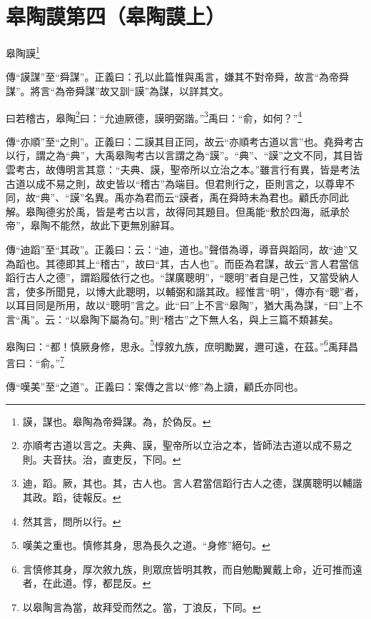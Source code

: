 \section{皋陶謨第四（皋陶謨上）}


皋陶謨\footnote{謨，謀也。皋陶為帝舜謀。為，於偽反。}

{\noindent\zhuan{}\fzbyks 傳“謨謀”至“舜謀”。正義曰：孔以此篇惟與禹言，嫌其不對帝舜，故言“為帝舜謀”。將言“為帝舜謀”故又訓“謨”為謀，以詳其文。 \par}

曰若稽古，皋陶\footnote{亦順考古道以言之。夫典、謨，聖帝所以立治之本，皆師法古道以成不易之則。夫音扶。治，直吏反，下同。}曰：“允迪厥德，謨明弼諧。”\footnote{迪，蹈。厥，其也。其，古人也。言人君當信蹈行古人之德，謀廣聰明以輔諧其政。蹈，徒報反。}禹曰：“俞，如何？”\footnote{然其言，問所以行。}

{\noindent\zhuan{}\fzbyks 傳“亦順”至“之則”。正義曰：二謨其目正同，故云“亦順考古道以言”也。堯舜考古以行，謂之為“典”，大禹皋陶考古以言謂之為“謨”。“典”、“謨”之文不同，其目皆雲考古，故傳明言其意：“夫典、謨，聖帝所以立治之本。”雖言行有異，皆是考法古道以成不易之則，故史皆以“稽古”為端目。但君則行之，臣則言之，以尊卑不同，故“典”、“謨”名異。禹亦為君而云“謨者，禹在舜時未為君也。顧氏亦同此解。皋陶德劣於禹，皆是考古以言，故得同其題目。但禹能“敷於四海，祇承於帝”，皋陶不能然，故此下更無別辭耳。 \par}

{\noindent\zhuan{}\fzbyks 傳“迪蹈”至“其政”。正義曰：云：“迪，道也。”聲借為導，導音與蹈同，故“迪”又為蹈也。其德即其上“稽古”，故曰“其，古人也”。而臣為君謀，故云“言人君當信蹈行古人之德”，謂蹈履依行之也。“謀廣聰明”，“聰明”者自是己性，又當受納人言，使多所聞見，以博大此聰明，以輔弼和諧其政。經惟言“明”，傳亦有“聰”者，以耳目同是所用，故以“聰明”言之。此“曰”上不言“皋陶”，猶大禹為謀，“曰”上不言“禹”。云：“以皋陶下屬為句。”則“稽古”之下無人名，與上三篇不類甚矣。 \par}

皋陶曰：“都！慎厥身修，思永。\footnote{嘆美之重也。慎修其身，思為長久之道。“身修”絕句。}惇敘九族，庶明勵翼，邇可遠，在茲。”\footnote{言慎修其身，厚次敘九族，則眾庶皆明其教，而自勉勵翼戴上命，近可推而遠者，在此道。惇，都昆反。}禹拜昌言曰：“俞。”\footnote{以皋陶言為當，故拜受而然之。當，丁浪反，下同。}

{\noindent\zhuan{}\fzbyks 傳“嘆美”至“之道”。正義曰：案傳之言以“修”為上讀，顧氏亦同也。 \par}

